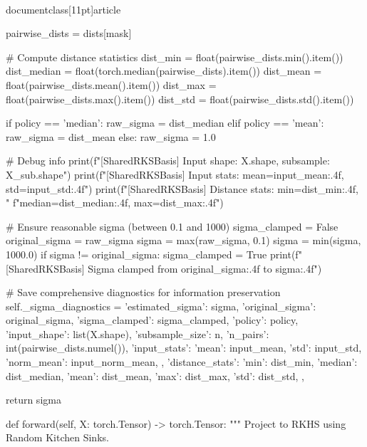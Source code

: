 \\documentclass[11pt]{article}
\begin{document}
\begin{CodeBlock}
            pairwise_dists = dists[mask]
            
            # Compute distance statistics
            dist_min = float(pairwise_dists.min().item())
            dist_median = float(torch.median(pairwise_dists).item())
            dist_mean = float(pairwise_dists.mean().item())
            dist_max = float(pairwise_dists.max().item())
            dist_std = float(pairwise_dists.std().item())
            
            if policy == 'median':
                raw_sigma = dist_median
            elif policy == 'mean':
                raw_sigma = dist_mean
            else:
                raw_sigma = 1.0
            
            # Debug info
            print(f"[SharedRKSBasis] Input shape: {X.shape}, subsample: {X_sub.shape}")
            print(f"[SharedRKSBasis] Input stats: mean={input_mean:.4f}, std={input_std:.4f}")
            print(f"[SharedRKSBasis] Distance stats: min={dist_min:.4f}, "
                  f"median={dist_median:.4f}, max={dist_max:.4f}")
            
            # Ensure reasonable sigma (between 0.1 and 1000)
            sigma_clamped = False
            original_sigma = raw_sigma
            sigma = max(raw_sigma, 0.1)
            sigma = min(sigma, 1000.0)
            if sigma != original_sigma:
                sigma_clamped = True
                print(f"[SharedRKSBasis] Sigma clamped from {original_sigma:.4f} to {sigma:.4f}")
            
            # Save comprehensive diagnostics for information preservation
            self._sigma_diagnostics = {
                'estimated_sigma': sigma,
                'original_sigma': original_sigma,
                'sigma_clamped': sigma_clamped,
                'policy': policy,
                'input_shape': list(X.shape),
                'subsample_size': n,
                'n_pairs': int(pairwise_dists.numel()),
                'input_stats': {
                    'mean': input_mean,
                    'std': input_std,
                    'norm_mean': input_norm_mean,
                },
                'distance_stats': {
                    'min': dist_min,
                    'median': dist_median,
                    'mean': dist_mean,
                    'max': dist_max,
                    'std': dist_std,
                },
            }
            
            return sigma
    
    def forward(self, X: torch.Tensor) -> torch.Tensor:
        """
        Project to RKHS using Random Kitchen Sinks.
        

\end{CodeBlock}
\end{document}
